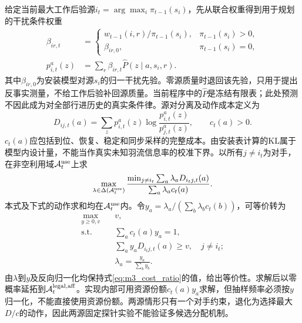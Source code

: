 给定当前最大工作后验源$i_t=\arg\max_i\pi_{t-1}(s_i)$，先从联合权重得到用于规划的干扰条件权重
\begin{equation}
\begin{aligned}
\beta_{ir,t}&=\begin{cases}
w_{t-1}(i,r)/\pi_{t-1}(s_i),&\pi_{t-1}(s_i)>0,\\
\beta_{ir,0},&\pi_{t-1}(s_i)=0,
\end{cases}\\
p_{i,t}^{a}(z)&=\sum_r\beta_{ir,t}\widehat P(z\mid a,s_i,r).
\end{aligned}
\label{eq:m3_predictive}
\end{equation}
其中$\beta_{ir,0}$为安装模型对源$s_i$的归一干扰先验。零源质量时退回该先验，只用于提出反事实测量，不给工作后验补回源质量。当前程序中的$\widehat P$是冻结有限表；此处预测不因此成为对全部行进历史的真实条件律。源对分离及动作成本定义为
\begin{equation}
D_{ij,t}(a)=\sum_zp_{i,t}^a(z)\log\frac{p_{i,t}^a(z)}{p_{j,t}^a(z)},\qquad c_t(a)>0.
\label{eq:m3_kl}
\end{equation}
$c_t(a)$应包括到位、恢复、稳定和同步采样的完整成本。由安装表计算的KL属于模型内设计量，不能当作真实未知羽流信息率的校准下界。以所有$j\ne i_t$为对手，在非空利用域$\mathcal A_t^{\rm use}$上求
\begin{equation}
\max_{\lambda\in\Delta(\mathcal A_t^{\rm use})}
\frac{\min_{j\ne i_t}\sum_a\lambda_aD_{i_tj,t}(a)}
{\sum_a\lambda_ac_t(a)}.
\label{eq:m3_cost_ratio}
\end{equation}
本式及下式的动作求和均在$\mathcal A_t^{\rm use}$内。令$y_a=\lambda_a/(\sum_b\lambda_bc_t(b))$，可等价转为
\begin{equation}
\begin{aligned}
\max_{y\ge0,v}\quad&v,\\
\mathrm{s.t.}\quad&\sum_ac_t(a)y_a=1,\\
&\sum_ay_aD_{i_tj,t}(a)\ge v,\quad j\ne i_t;\\
&\lambda_a=\frac{y_a}{\sum_by_b}.
\end{aligned}
\label{eq:m3_lp}
\end{equation}
由$\lambda$到$y$及反向归一化均保持式\eqref{eq:m3_cost_ratio}的值，给出等价性。求解后以零概率延拓到$\mathcal A_t^{\rm legal,aff}$。实现内部可用资源份额$c_t(a)y_a$求解，但抽样频率必须按$y$归一化，不能直接使用资源份额。两源情形只有一个对手约束，退化为选择最大$D/c$的动作，因此两源固定探针实验不能验证多候选分配机制。

